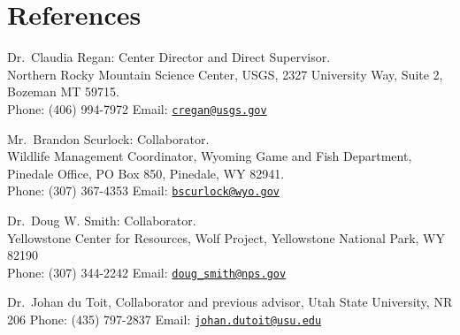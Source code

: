 \documentclass[12pt,]{article}
\begin{document}
\hypertarget{references}{%
\section{References}\label{references}}

Dr.~Claudia Regan: Center Director and Direct Supervisor.\\
Northern Rocky Mountain Science Center, USGS, 2327 University Way, Suite
2, Bozeman MT 59715.\\
Phone: (406) 994-7972 Email:
\href{mailto:cregan@usgs.gov}{\nolinkurl{cregan@usgs.gov}}

Mr.~Brandon Scurlock: Collaborator.\\
Wildlife Management Coordinator, Wyoming Game and Fish Department,
Pinedale Office, PO Box 850, Pinedale, WY 82941.\\
Phone: (307) 367-4353 Email:
\href{mailto:bscurlock@wyo.gov}{\nolinkurl{bscurlock@wyo.gov}}

Dr.~Doug W. Smith: Collaborator.\\
Yellowstone Center for Resources, Wolf Project, Yellowstone National
Park, WY 82190\\
Phone: (307) 344-2242 Email:
\href{mailto:doug_smith@nps.gov}{\nolinkurl{doug\_smith@nps.gov}}

Dr.~Johan du Toit, Collaborator and previous advisor, Utah State
University, NR 206 Phone: (435) 797-2837 Email:
\href{mailto:johan.dutoit@usu.edu}{\nolinkurl{johan.dutoit@usu.edu}}
\end{document}
